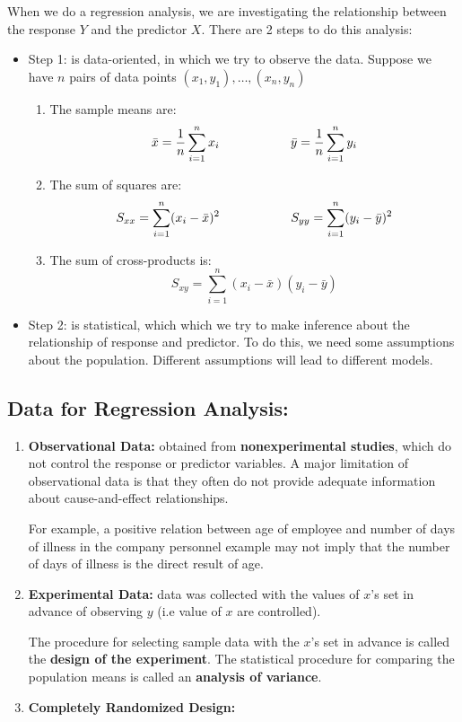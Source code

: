 \documentclass[11pt]{article}
\begin{document}
When we do a regression analysis, we are investigating the relationship between the response $Y$ and the predictor $X$. There are 2 steps to do this analysis:
\begin{itemize}
	\item Step 1: is data-oriented, in which we try to observe the data. Suppose we have $n$ pairs of data points $(x_1, y_1), \dots, (x_n, y_n)$ 
	\begin{enumerate}
		\item The sample means are:
		\begin{equation} \label{eq: means}
			\bar{x}  = \dfrac{1}{n} \sum_{ i = 1}^n x_i \hspace*{ 2.0cm} \bar{y} = \dfrac{1}{n} \sum_{i = 1}^n y_i 
		\end{equation}
		\item The sum of squares are:
		\begin{equation}\label{eq: SSQ}
			S_{xx} = \sum_{i = 1}^n (x_i - \bar{x})^2 \hspace*{2.0 cm} S_{yy} = \sum_{i = 1}^n (y_i - \bar{y})^2
		\end{equation}
		\item The sum of cross-products is:
		\begin{equation}\label{eq: SCP}
			S_{xy} = \sum_{i = 1}^n (x_i - \bar{x})(y_i - \bar{y})
		\end{equation}
	
	\end{enumerate}
	\item Step 2: is statistical, which which we try to make inference about the relationship of response and predictor. To do this, we need  some assumptions about the population. Different assumptions will lead to different models.
\end{itemize}
\subsection{Data for Regression Analysis: }
\begin{enumerate}
	\item \textbf{Observational Data: } obtained from \textbf{nonexperimental studies}, which do not control the response or predictor variables. A major limitation of observational data is that they often do not provide adequate information about cause-and-effect relationships. 
	
	For example, a positive relation between age of employee and number of days of illness in the company personnel example may not imply that the number of days of illness is the direct result of age.
	
	\item \textbf{Experimental Data: } data was collected with the values of $x$'s set in advance of observing $y$ (i.e value of $x$ are controlled).
	
	The procedure for selecting sample data with the $x$'s set in advance is called the \textbf{design of the experiment}. The statistical procedure for comparing the population means is called an \textbf{analysis of variance}.
	
	\item \textbf{Completely Randomized Design: }
\end{enumerate}
\end{document}
